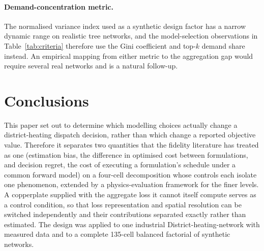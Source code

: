 \documentclass[a4paper,fleqn]{cas-sc}
\begin{document}
\paragraph{Demand-concentration metric.}
The normalised variance index used as a synthetic design factor has a narrow dynamic range
on realistic tree networks, and the model-selection observations in
Table~\ref{tab:criteria} therefore use the Gini coefficient and top-$k$ demand share
instead. An empirical mapping from either metric to the aggregation gap would require
several real networks and is a natural follow-up.

\section{Conclusions}\label{sec:conclusion}

This paper set out to determine which modelling choices actually change a district-heating
dispatch decision, rather than which change a reported objective value. Therefore it
separates two quantities that the fidelity literature has treated as one (estimation
bias, the difference in optimised cost between formulations, and decision regret, the cost
of executing a formulation's schedule under a common forward model) on a four-cell
decomposition whose controls each isolate one phenomenon, extended by a physics-evaluation
framework for the finer levels. A copperplate supplied with the
aggregate loss it cannot itself compute serves as a control condition, so that loss
representation and spatial resolution can be switched independently and their contributions
separated exactly rather than estimated. The design was applied to one industrial District-heating-network
with measured data and to a complete 135-cell balanced factorial of synthetic networks.
\end{document}
